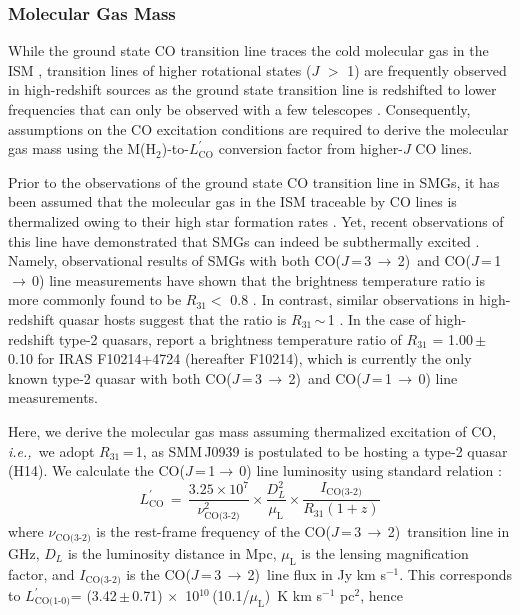 \documentclass[twocolumn,apj,numberedappendix]{emulateapj}
\newcommand{\rarr}{$\rightarrow$}
\newcommand{\CO}{\mbox{CO($J$\,=\,3\,$\rightarrow$\,2) }}
\newcommand{\Lp}{\mbox{$L^{\prime}_\textrm{CO(1-0)}$}}
\newcommand{\LpU}{\mbox{K\,\,km\,\,s$^{-1}$\,\,pc$^2$}}
\newcommand{\eg}{{\sl e.g.,~}}
\newcommand{\ie}{{\sl i.e.,~}}
\newcommand{\pmOne}{\mbox{$^{-1}$}}
\begin{document}
\subsubsection{Molecular Gas Mass}
While the ground state CO transition line traces the cold molecular gas in the ISM
\citep*[\eg][]{Wilson70a,Downes98a}, transition lines of higher rotational states ($J$ $>$ 1) are frequently observed in high-redshift sources as the
 ground state transition line is redshifted to lower frequencies that can only be observed with a few telescopes
 \citep{Carilli13a}. Consequently, assumptions on the CO excitation conditions are required to derive the molecular gas mass using the M(H$_\textrm{2}$)-to-$L^{\prime}_\textrm{CO}$
 conversion factor from higher-$J$ CO lines. \par
Prior to the observations of the ground state CO transition line in SMGs, it has been assumed that the molecular gas in the
  ISM traceable by CO lines is thermalized owing to their high star formation rates \citep[\eg][]{Greve05a, Coppin08a}.
   Yet, recent observations of this line have demonstrated that SMGs can indeed be subthermally excited
   \citep{Harris10a,Riechers11c,Riechers11d,Ivison11a}. Namely, observational results of SMGs with both \CO and CO($J$\,=\,1\,\rarr\,0) line measurements have shown that the
   brightness temperature ratio is more commonly found to be $R_\textrm{31}<$ 0.8 \citep
   {Harris10a,Carilli10a,Swinbank2010a,Ivison10d,Ivison11a,Riechers11d}. In contrast, similar observations in high-redshift quasar hosts suggest that the ratio
   is $R_\textrm{31}$\,$\sim$\,1 \citep{Riechers06a, Riechers11a}. In the case of high-redshift type-2 quasars, \citet{Riechers11a} report a brightness temperature ratio of $R_\textrm{31}$ = 1.00\,$\pm$\,0.10 for IRAS F10214+4724 (hereafter F10214), which is currently the only known type-2 quasar with both \CO and CO($J$\,=\,1\,\rarr\,0) line measurements. \par
Here, we derive the molecular gas mass
assuming thermalized excitation of CO,
\ie we adopt $R_\textrm{31}$\,=\,1, as SMM\,J0939 is
postulated to be hosting a type-2 quasar (H14).
We calculate the CO($J$\,=\,1\rarr\,0) line luminosity using standard relation
\citep[\eg][]{Solomon05a,Carilli13a}:
\begin{equation}
L^{\prime}_\textrm{CO}\,=\,\frac{3.25\times10^7}{\nu_\textrm{CO(3-2)}^2}\times \frac{D_L^2}{\mu_\textrm{L}} \times
\frac{I_\textrm{CO(3-2)}} {R_\textrm{31} (1 + z)}
\end{equation}
where $\nu_\textrm{CO(3-2)}$ is the rest-frame frequency of the \CO transition line in GHz, $D_L$ is the luminosity distance in Mpc, $\mu_\textrm{L}$ is the lensing magnification factor, and $I_\textrm{CO(3-2)}$ is the \CO line flux in Jy\,\,km\,\,s\pmOne. This corresponds to \Lp = (3.42\,$\pm$\,0.71) $\times$~10$^{10}$\,(10.1/$\mu_\textrm{L}$)~\LpU, hence
\end{document}
